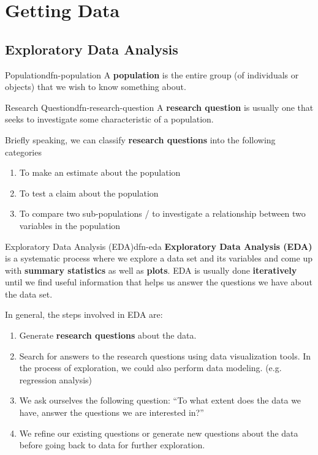 \documentclass[math,code]{amznotes}
\theoremstyle{remark}
\begin{document}
\tableofcontents

\chapter{Getting Data}
\section{Exploratory Data Analysis}
\begin{dfnbox}{Population}{dfn-population}
    A {\color{red} \textbf{population}} is the entire group (of individuals or objects) that we wish to know something about.
\end{dfnbox}
\begin{dfnbox}{Research Question}{dfn-research-question}
    A {\color{red} \textbf{research question}} is usually one that seeks to investigate some characteristic of a population.
\end{dfnbox}
Briefly speaking, we can classify \textbf{research questions} into the following categories
\begin{enumerate}
    \item To make an estimate about the population
    \item To test a claim about the population
    \item To compare two sub-populations / to investigate a relationship between two variables in the population
\end{enumerate}
\begin{dfnbox}{Exploratory Data Analysis (EDA)}{dfn-eda}
    {\color{red} \textbf{Exploratory Data Analysis (EDA)}} is a systematic process where we explore a data set and its variables and come up with \textbf{summary statistics} as well as \textbf{plots}. EDA is usually done \textbf{iteratively} until we find useful information that helps us answer the questions we have about the data set.
\end{dfnbox}
In general, the steps involved in EDA are:
\begin{enumerate}
    \item Generate \textbf{research questions} about the data.
    \item Search for answers to the research questions using data visualization tools. In the process of exploration, we could also perform data modeling. (e.g. regression analysis)
    \item We ask ourselves the following question: ``To what extent does the data we have, answer the questions we are interested in?''
    \item We refine our existing questions or generate new questions about the data before going back to data for further exploration.
\end{enumerate}
\end{document}
